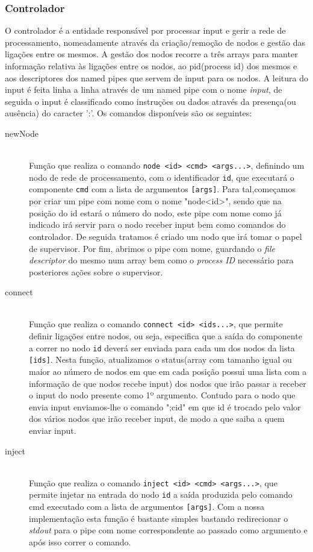 \documentclass[12pt]{article}
\begin{document}
\subsubsection{Controlador}
O controlador é a entidade responsável por processar input e gerir a rede de processamento, nomeadamente através da criação/remoção de nodos e gestão das ligações entre os mesmos.
A gestão dos nodos recorre a três arrays para manter informação relativa às ligações entre os nodos, ao pid(process id) dos mesmos e aos descriptores dos named pipes que servem de input para os nodos.
A leitura do input é feita linha a linha através de um named pipe com o nome \textit{input}, de seguida o input é classificado como instruções ou dados através da presença(ou ausência) do caracter ':'.
Os comandos disponíveis são os seguintes:

\begin{description} 
\item[newNode] \hfill \\
   Função que realiza o comando \texttt{node <id> <cmd> <args...>}, definindo um nodo de rede de processamento, com o identificador  \texttt{id}, que executará o componente \texttt{cmd} com a lista de argumentos \texttt{[args]}. Para tal,começamos por criar um pipe com nome com o nome "node<id>", sendo que na posição do id estará o número do nodo, este pipe com nome como já indicado irá servir para o nodo receber input bem como comandos do controlador. De seguida tratamos é criado um nodo que irá tomar o papel de supervisor. Por fim, abrimos o pipe com nome, guardando o \textit{file descriptor} do mesmo num array bem como o \textit{process ID} necessário para posteriores ações sobre o supervisor.


\item[connect] \hfill \\
    Função que realiza o comando \texttt{connect <id> <ids...>}, que permite definir ligações entre nodos, ou seja, especifica que a saída do componente a correr no nodo \texttt{id} deverá ser enviada para cada um dos nodos da lista \texttt{[ids]}. Nesta função, atualizamos o status(array com tamanho igual ou maior ao número de nodos em que em cada posição possui uma lista com a informação de que nodos recebe input) dos nodos que irão passar a receber o input do nodo presente como 1º argumento. Contudo para o nodo que envia input enviamos-lhe o comando ";cid" em que id é trocado pelo valor dos vários nodos que irão receber input, de modo a que saiba a quem enviar input.

\item[inject] \hfill \\
    Função que realiza o comando \texttt{inject <id> <cmd> <args...>}, que permite injetar na entrada do nodo \texttt{id} a saída produzida pelo comando cmd executado com a lista de argumentos \texttt{[args]}. Com a nossa implementação esta função é bastante simples bastando redirecionar o \textit{stdout} para o pipe com nome correspondente ao passado como argumento e após isso correr o comando. 


\end{description}
\end{document}
